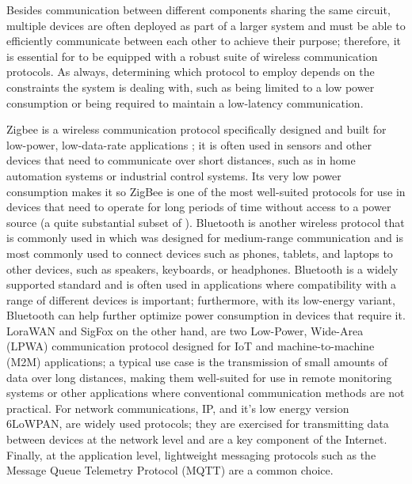 Besides communication between different components sharing the same circuit, multiple devices are often deployed as part of a larger system and must be able to efficiently communicate between each other to achieve their purpose; therefore, it is essential for \ess to be equipped with a robust suite of wireless communication protocols. As always, determining which protocol to employ depends on the constraints the system is dealing with, such as being limited to a low power consumption or being required to maintain a low-latency communication.

Zigbee is a wireless communication protocol specifically designed and built for low-power, low-data-rate applications \cite{Zigbee}; it is often used in sensors and other devices that need to communicate over short distances, such as in home automation systems or industrial control systems. Its very low power consumption makes it so ZigBee is one of the most well-suited protocols for use in devices that need to operate for long periods of time without access to a power source (\ie a quite substantial subset of \ess).
Bluetooth is another wireless protocol that is commonly used in \es which was designed for medium-range communication and is most commonly used to connect devices such as phones, tablets, and laptops to other devices, such as speakers, keyboards, or headphones. Bluetooth is a widely supported standard and is often used in applications where compatibility with a range of different devices is important; furthermore, with its low-energy variant, Bluetooth can help further optimize power consumption in devices that require it.
LoraWAN and SigFox on the other hand, are two Low-Power, Wide-Area (LPWA) communication protocol designed for IoT and machine-to-machine (M2M) applications; a typical use case is the transmission of small amounts of data over long distances, making them well-suited for use in remote monitoring systems or other applications where conventional communication methods are not practical.
For network communications, IP, and it's low energy version 6LoWPAN, are widely used protocols; they are exercised for transmitting data between devices at the network level and are a key component of the Internet.
Finally, at the application level, lightweight messaging protocols such as the Message Queue Telemetry Protocol (MQTT) are a common choice.





